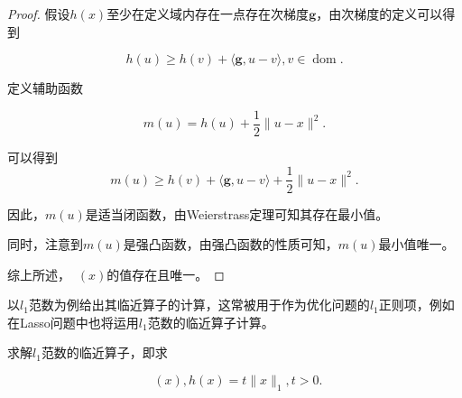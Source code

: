 \begin{proof}
    假设$h(x)$至少在定义域内存在一点存在次梯度$\bm{g}$，由次梯度的定义可以得到

    \begin{equation}
        h(u)\geq h(v)+\langle \bm{g}, u-v\rangle, v\in \mathop{\mathrm{dom} (h)}.
    \end{equation}

    定义辅助函数

    \begin{equation}
        m(u)=h(u)+\frac{1}{2}\|u-x\|^{2}.
    \end{equation}

    可以得到
    \begin{equation}
        m(u)\geq h(v) + \langle \bm{g}, u-v\rangle + \frac{1}{2}\|u-x\|^{2}.
    \end{equation}

    因此，$m(u)$是适当闭函数，由Weierstrass定理可知其存在最小值。

    同时，注意到$m(u)$是强凸函数，由强凸函数的性质可知，$m(u)$最小值唯一。

    综上所述，$\mathop{\mathrm{prox_{h}}}(x)$的值存在且唯一。
\end{proof}

以$l_{1}$范数为例给出其临近算子的计算，这常被用于作为优化问题的$l_{1}$正则项，例如在Lasso问题中也将运用$l_{1}$范数的临近算子计算。

\begin{problem}\label{exp_prox_1}
    求解$l_{1}$范数的临近算子，即求

    \begin{equation}
        \mathop{\mathrm{prox_{h}}}(x), h(x)=t\|x\|_{1}, t > 0.
    \end{equation}
\end{problem}

